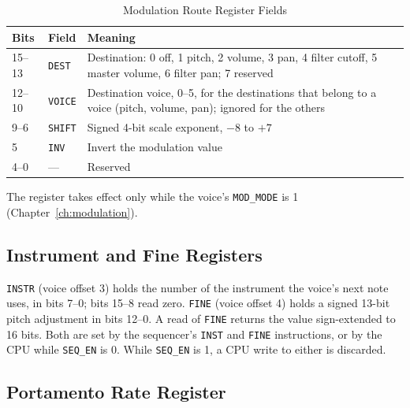 \begin{table}[H]
	\centering
	\begin{tabular}{llp{8cm}}
		\toprule
		\textbf{Bits} & \textbf{Field} & \textbf{Meaning}                                                                                                  \\
		\midrule
		15--13        & \texttt{DEST}  & Destination: 0 off, 1 pitch, 2 volume, 3 pan, 4 filter cutoff, 5 master volume, 6 filter pan; 7 reserved          \\
		12--10        & \texttt{VOICE} & Destination voice, 0--5, for the destinations that belong to a voice (pitch, volume, pan); ignored for the others \\
		9--6          & \texttt{SHIFT} & Signed 4-bit scale exponent, $-8$ to $+7$                                                                         \\
		5             & \texttt{INV}   & Invert the modulation value                                                                                       \\
		4--0          & ---            & Reserved                                                                                                          \\
		\bottomrule
	\end{tabular}
	\caption{Modulation Route Register Fields}
	\label{tab:reg-mod-route-fields}
\end{table}

The register takes effect only while the voice's \texttt{MOD\_MODE} is 1 (Chapter~\ref{ch:modulation}).

\subsection{Instrument and Fine Registers}

\texttt{INSTR} (voice offset 3) holds the number of the instrument the voice's next note uses, in bits 7--0; bits 15--8
read zero. \texttt{FINE} (voice offset 4) holds a signed 13-bit pitch adjustment in bits 12--0. A read of \texttt{FINE}
returns the value sign-extended to 16 bits. Both are set by the sequencer's \texttt{INST} and \texttt{FINE}
instructions, or by the CPU while \texttt{SEQ\_EN} is 0. While \texttt{SEQ\_EN} is 1, a CPU write to either is
discarded.

\subsection{Portamento Rate Register}

